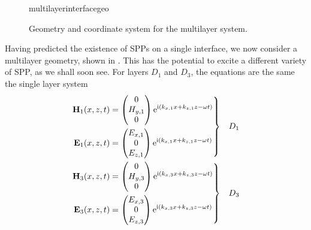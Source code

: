 \begin{figure}[ht]
 \centering
 {multilayerinterfacegeo}
 \caption{Geometry and coordinate system for the multilayer system. }
 \label{fig:multilayergeo}
\end{figure}
Having predicted the existence of SPPs on a single interface, we now
consider a multilayer geometry, shown in .  This
has the potential to excite a different variety of SPP, as we shall soon
see.  For
layers $D_1$ and $D_3$, the equations are the same the
single layer system
\begin{align}
\left.\begin{aligned}
\mathbf{H}_1(x,z,t) &=
\begin{pmatrix}
0\\
H_{y,1}\\
0
\end{pmatrix} {\mathrm{e}}^{{\mathrm{i}}(k_{x,1}x+k_{z,1}z-\omega t)}\\
\mathbf{E}_1(x,z,t) &=
\begin{pmatrix}
E_{x,1}\\
0\\
E_{z,1}\\
\end{pmatrix} {\mathrm{e}}^{{\mathrm{i}}(k_{x,1}x+k_{z,1}z-\omega t)}
\end{aligned}
\right\}& \quad D_1\label{eqn:lrsppplanewavedielectric}\\
\left.\begin{aligned}
\mathbf{H}_3(x,z,t) &=
\begin{pmatrix}
0\\
H_{y,3}\\
0
\end{pmatrix}
{\mathrm{e}}^{{\mathrm{i}}(k_{x,3}x+k_{z,3}z-\omega t)}\\
\mathbf{E}_3(x,z,t) &=
\begin{pmatrix}
E_{x,3}\\
0\\
E_{z,3}\\
\end{pmatrix}
{\mathrm{e}}^{{\mathrm{i}}(k_{x,3}x+k_{z,3}z-\omega t)}
\end{aligned} 
\right\}&\quad D_3
\label{eqn:lrsppplanewavemetal}
\end{align}

